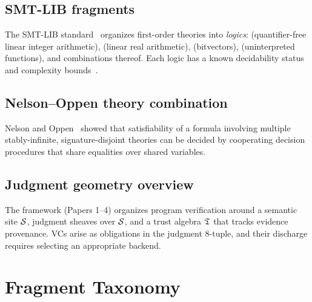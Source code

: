\documentclass[11pt]{article}
\begin{document}
\subsection{SMT-LIB fragments}

The SMT-LIB standard~\cite{smtlib} organizes first-order
theories into \emph{logics}: \QFLIA{} (quantifier-free linear
integer arithmetic), \QFLRA{} (linear real arithmetic),
\QFBV{} (bitvectors), \QFUF{} (uninterpreted functions),
and combinations thereof.  Each logic has a known decidability
status and complexity bounds~\cite{kroening-strichman}.

\subsection{Nelson--Oppen theory combination}

Nelson and Oppen~\cite{nelson-oppen} showed that satisfiability
of a formula involving multiple stably-infinite, signature-disjoint
theories can be decided by cooperating decision procedures that
share equalities over shared variables.

\subsection{Judgment geometry overview}

The \JuGeo{} framework (Papers 1--4) organizes program verification
around a semantic site $\mathcal{S}$, judgment sheaves over $\mathcal{S}$,
and a trust algebra $\mathfrak{T}$ that tracks evidence provenance.
VCs arise as obligations in the judgment 8-tuple, and their
discharge requires selecting an appropriate backend.

\section{Fragment Taxonomy}\label{sec:taxonomy}
\end{document}
